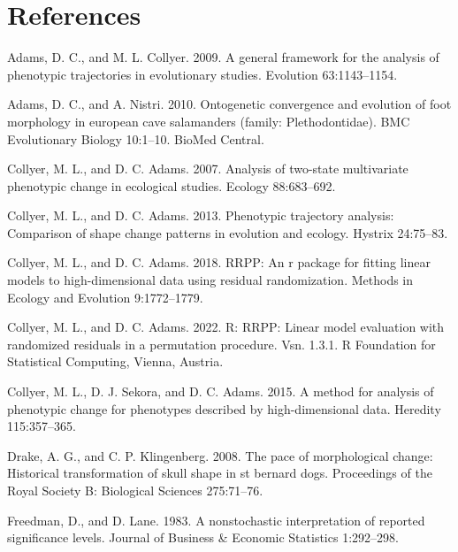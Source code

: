 \documentclass[
]{article}
\begin{document}
\hypertarget{references}{%
\section*{References}\label{references}}

\setlength{\parindent}{-0.25in} \setlength{\leftskip}{0.25in}
\setlength{\parskip}{8pt} \noindent

\hypertarget{refs}{}
\leavevmode\hypertarget{ref-AdamsCollyer2009}{}%
Adams, D. C., and M. L. Collyer. 2009. A general framework for the
analysis of phenotypic trajectories in evolutionary studies. Evolution
63:1143--1154.

\leavevmode\hypertarget{ref-AdamsNistri2010}{}%
Adams, D. C., and A. Nistri. 2010. Ontogenetic convergence and evolution
of foot morphology in european cave salamanders (family:
Plethodontidae). BMC Evolutionary Biology 10:1--10. BioMed Central.

\leavevmode\hypertarget{ref-CollyerAdams2007}{}%
Collyer, M. L., and D. C. Adams. 2007. Analysis of two-state
multivariate phenotypic change in ecological studies. Ecology
88:683--692.

\leavevmode\hypertarget{ref-CollyerAdams2013}{}%
Collyer, M. L., and D. C. Adams. 2013. Phenotypic trajectory analysis:
Comparison of shape change patterns in evolution and ecology. Hystrix
24:75--83.

\leavevmode\hypertarget{ref-CollyerAdams2018}{}%
Collyer, M. L., and D. C. Adams. 2018. RRPP: An r package for fitting
linear models to high-dimensional data using residual randomization.
Methods in Ecology and Evolution 9:1772--1779.

\leavevmode\hypertarget{ref-RRPP}{}%
Collyer, M. L., and D. C. Adams. 2022. R: RRPP: Linear model evaluation
with randomized residuals in a permutation procedure. Vsn. 1.3.1. R
Foundation for Statistical Computing, Vienna, Austria.

\leavevmode\hypertarget{ref-Collyer_et_al2015}{}%
Collyer, M. L., D. J. Sekora, and D. C. Adams. 2015. A method for
analysis of phenotypic change for phenotypes described by
high-dimensional data. Heredity 115:357--365.

\leavevmode\hypertarget{ref-DrakeKlingenberg2008}{}%
Drake, A. G., and C. P. Klingenberg. 2008. The pace of morphological
change: Historical transformation of skull shape in st bernard dogs.
Proceedings of the Royal Society B: Biological Sciences 275:71--76.

\leavevmode\hypertarget{ref-Freedman1983}{}%
Freedman, D., and D. Lane. 1983. A nonstochastic interpretation of
reported significance levels. Journal of Business \& Economic Statistics
1:292--298.
\end{document}
